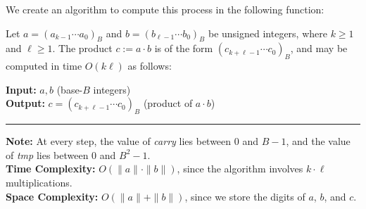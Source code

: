 \noindent
We create an algorithm to compute this process in the following function:
\begin{Func}
    \label{func:mul}
    Let $a = (a_{k-1} \cdots a_0)_B$ and $b = (b_{\ell-1} \cdots b_0)_B$ be unsigned integers, where $k \geq 1$ and $\ell \geq 1$. The product $c := a \cdot b$ is of the form $(c_{k+\ell-1} \cdots c_0)_B$, and may be computed in time $O(k\ell)$ as follows:

    \vspace{.5em}
    \noindent
    \textbf{Input:} $a, b$ (base-$B$ integers)\\
    \textbf{Output:} $c = (c_{k+\ell-1} \cdots c_0)_B$ (product of $a \cdot b$)\\

    \begin{algorithm}[H]
        \SetAlgoLined
    \end{algorithm}

    \noindent\rule{\textwidth}{0.4pt}
    
    \noindent
    \textbf{Note:} At every step, the value of \textit{carry} lies between $0$ and $B-1$, and the value of \textit{tmp} lies between $0$ and $B^2 - 1$.\\
    \textbf{Time Complexity:} $O(\|a\|\cdot\|b\|)$, since the algorithm involves $k \cdot \ell$ multiplications.\\
    \textbf{Space Complexity:} $O(\|a\| + \|b\|)$, since we store the digits of $a$, $b$, and $c$.
\end{Func}



